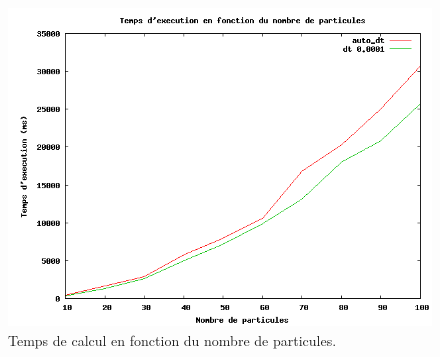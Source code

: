 \begin{figure}
\centering
\includegraphics[scale=0.5]{img/graph_auto_dt.png}
\caption{Temps de calcul en fonction du nombre de particules.}
\label{img:dt}
\end{figure}

